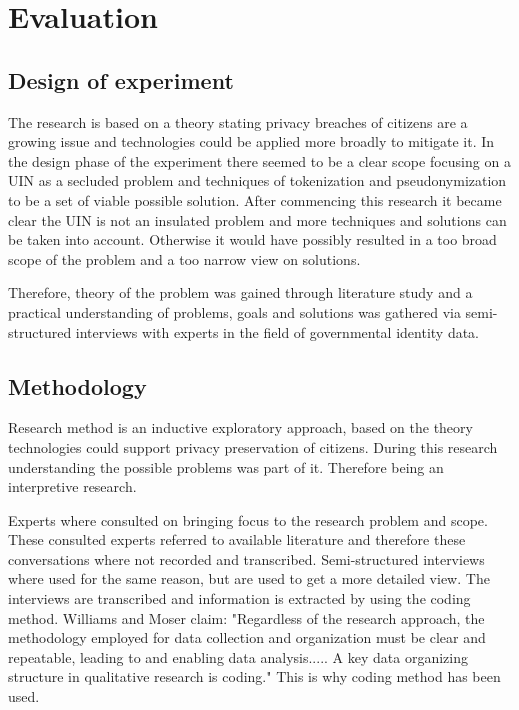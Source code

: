 \chapter{Evaluation}\label{s:evaluation}

\section{Design of experiment}
The research is based on a theory stating privacy breaches of citizens are a growing issue and technologies could be applied more broadly to mitigate it. In the design phase of the experiment there seemed to be a clear scope focusing on a UIN as a secluded problem and techniques of tokenization and pseudonymization to be a set of viable possible solution. After commencing this research it became clear the UIN is not an insulated problem and more techniques and solutions can be taken into account. Otherwise it would have possibly resulted in a too broad scope of the problem and a too narrow view on solutions.

Therefore, theory of the problem was gained through literature study and a practical understanding of problems, goals and solutions was gathered via semi-structured interviews with experts in the field of governmental identity data.

\section{Methodology}
Research method is an inductive exploratory approach, based on the theory technologies could support privacy preservation of citizens. During this research understanding the possible problems was part of it. Therefore being an interpretive research.

Experts where consulted on bringing focus to the research problem and scope. These consulted experts referred to available literature and therefore these conversations where not recorded and transcribed. Semi-structured interviews where used for the same reason, but are used to get a more detailed view. The interviews are transcribed and information is extracted by using the coding method.  Williams and Moser \cite{Williams2019TheAO} claim: "Regardless of the research approach, the methodology employed for data collection and
organization must be clear and repeatable, leading to and enabling data analysis..... A key data organizing structure in qualitative research is coding." This is why coding method has been used. 

